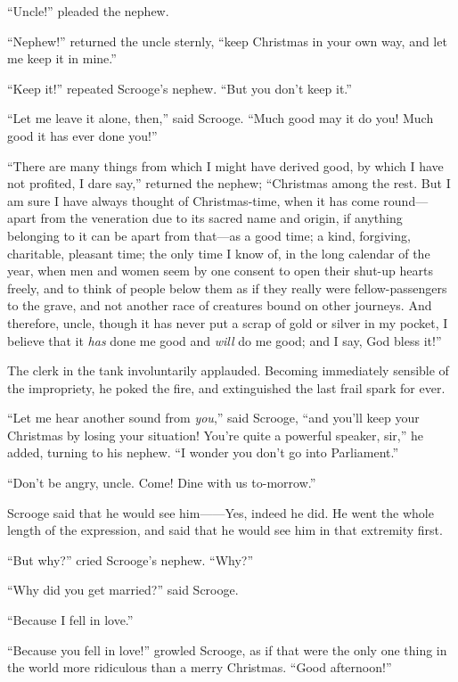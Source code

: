 \documentclass[paper=5.5in:8.5in,BCOR=15mm,twoside,DIV=15,headinclude=off,12pt,chapterprefix=off,openany,headings=huge]{scrbook} %
\begin{document}
\enquote{Uncle!} pleaded the nephew.

\enquote{Nephew!} returned the uncle sternly, \enquote{keep Christmas in your own way, and let me keep it in mine.}

\enquote{Keep it!} repeated Scrooge's nephew. \enquote{But you don't keep it.}

\enquote{Let me leave it alone, then,} said Scrooge. \enquote{Much good may it do you! Much good it has ever done you!}

\enquote{There are many things from which I might have derived good, by which I have not profited, I dare say,} returned the nephew; \enquote{Christmas among the rest. But I am sure I have always thought of Christmas-time, when it has come round—apart from the veneration due to its sacred name and origin, if anything belonging to it can be apart from that—as a good time; a kind, forgiving, charitable, pleasant time; the only time I know of, in the long calendar of the year, when men and women seem by one consent to open their shut-up hearts freely, and to think of people below them as if they really were fellow-passengers to the grave, and not another race of creatures bound on other journeys. And therefore, uncle, though it has never put a scrap of gold or silver in my pocket, I believe that it \textit{has} done me good and \textit{will} do me good; and I say, God bless it!}

The clerk in the tank involuntarily applauded. Becoming immediately sensible of the impropriety, he poked the fire, and extinguished the last frail spark for ever.

\enquote{Let me hear another sound from \textit{you},} said Scrooge, \enquote{and you'll keep your Christmas by losing your situation! You're quite a powerful speaker, sir,} he added, turning to his nephew. \enquote{I wonder you don't go into Parliament.}

\enquote{Don't be angry, uncle. Come! Dine with us to-morrow.}

Scrooge said that he would see him——Yes, indeed he did. He went the whole length of the expression, and said that he would see him in that extremity first.

\enquote{But why?} cried Scrooge's nephew. \enquote{Why?}

\enquote{Why did you get married?} said Scrooge.

\enquote{Because I fell in love.}

\enquote{Because you fell in love!} growled Scrooge, as if that were the only one thing in the world more ridiculous than a merry Christmas. \enquote{Good afternoon!}
\end{document}
